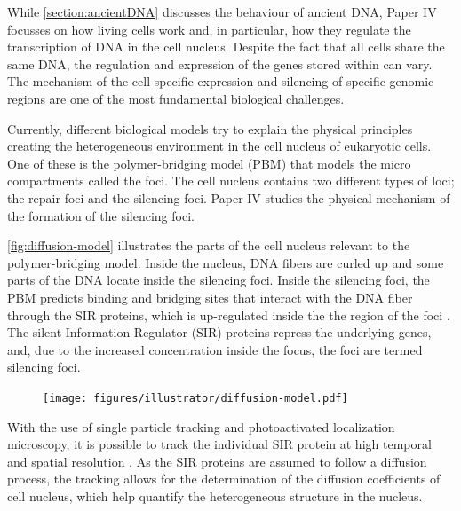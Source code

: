 While \autoref{section:ancientDNA} discusses the behaviour of ancient DNA, Paper IV focusses on how living cells work and, in particular, how they regulate the transcription of DNA in the cell nucleus.
Despite the fact that all cells share the same DNA, the regulation and expression of the genes stored within can vary. The mechanism of the cell-specific expression and silencing of specific genomic regions are one of the most fundamental biological challenges.

Currently, different biological models try to explain the physical principles creating the heterogeneous environment in the cell nucleus of eukaryotic cells.
One of these is the polymer-bridging model (PBM) that models the micro compartments called the foci. The cell nucleus contains two different types of loci; the repair foci and the silencing foci. Paper IV studies the physical mechanism of the formation of the silencing foci.

\autoref{fig:diffusion-model} illustrates the parts of the cell nucleus relevant to the polymer-bridging model. Inside the nucleus, DNA fibers are curled up and some parts of the DNA locate inside the silencing foci. Inside the silencing foci, the PBM predicts binding and bridging sites that interact with the DNA fiber through the SIR proteins, which is up-regulated inside the the region of the foci \autocite{heltbergPhysicalObservablesDetermine2021}. The silent Information Regulator (SIR) proteins repress the underlying genes, and, due to the increased concentration inside the focus, the foci are termed silencing foci.

\begin{figure}[htbp]
    \centering
    \texttt{[image: figures/illustrator/diffusion-model.pdf]}
\end{figure}

With the use of single particle tracking and photoactivated localization microscopy, it is possible to track the individual SIR protein at high temporal and spatial resolution \autocite{oswaldImagingQuantificationTransmembrane2014,manleyHighdensityMappingSinglemolecule2008}. As the SIR proteins are assumed to follow a diffusion process, the tracking allows for the determination of the diffusion coefficients of cell nucleus, which help quantify the heterogeneous structure in the nucleus.

